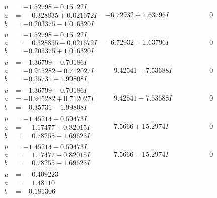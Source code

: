 \documentclass[1p]{elsarticle_modified}
\theoremstyle{definition}
\begin{document}
$$\begin{array}{c|c|c}
\begin{aligned}
u &= -1.52798 + 0.15122 I \\
a &= \phantom{-}0.328835 + 0.021672 I \\
b &= -0.203375 - 1.016320 I\end{aligned}
 & -6.72932 + 1.63796 I & \phantom{-0.000000 } 0 \\ \hline\begin{aligned}
u &= -1.52798 - 0.15122 I \\
a &= \phantom{-}0.328835 - 0.021672 I \\
b &= -0.203375 + 1.016320 I\end{aligned}
 & -6.72932 - 1.63796 I & \phantom{-0.000000 } 0 \\ \hline\begin{aligned}
u &= -1.36799 + 0.70186 I \\
a &= -0.945282 - 0.712027 I \\
b &= -0.35731 + 1.99808 I\end{aligned}
 & \phantom{-}9.42541 + 7.53688 I & \phantom{-0.000000 } 0 \\ \hline\begin{aligned}
u &= -1.36799 - 0.70186 I \\
a &= -0.945282 + 0.712027 I \\
b &= -0.35731 - 1.99808 I\end{aligned}
 & \phantom{-}9.42541 - 7.53688 I & \phantom{-0.000000 } 0 \\ \hline\begin{aligned}
u &= -1.45214 + 0.59473 I \\
a &= \phantom{-}1.17477 + 0.82015 I \\
b &= \phantom{-}0.78255 - 1.69623 I\end{aligned}
 & \phantom{-}7.5666 + 15.2974 I & \phantom{-0.000000 } 0 \\ \hline\begin{aligned}
u &= -1.45214 - 0.59473 I \\
a &= \phantom{-}1.17477 - 0.82015 I \\
b &= \phantom{-}0.78255 + 1.69623 I\end{aligned}
 & \phantom{-}7.5666 - 15.2974 I & \phantom{-0.000000 } 0 \\ \hline\begin{aligned}
u &= \phantom{-}0.409223\phantom{ +0.000000I} \\
a &= \phantom{-}1.48110\phantom{ +0.000000I} \\
b &= -0.181306\phantom{ +0.000000I}\end{aligned}

\end{array}$$
\end{document}
